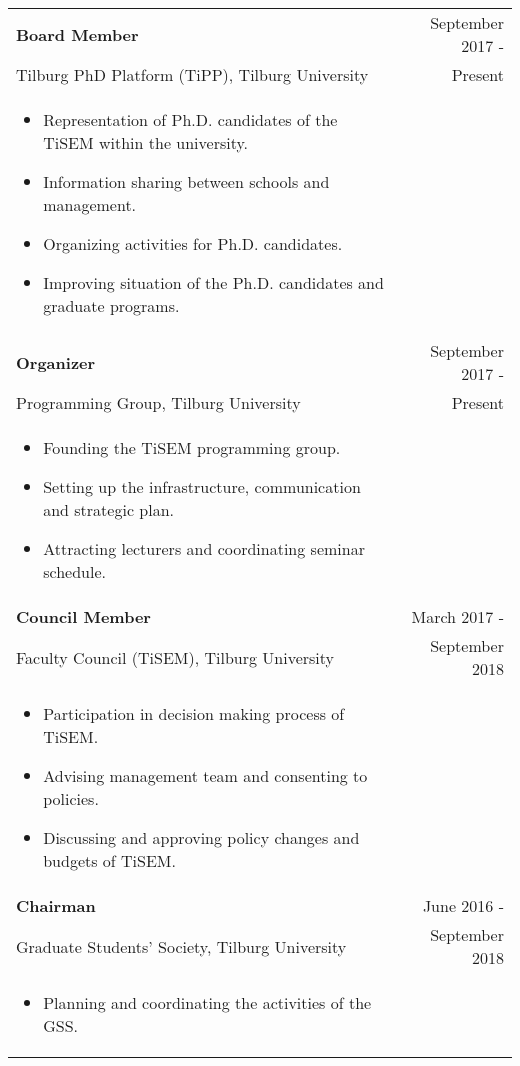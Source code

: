 \documentclass[a4paper,10pt]{article} %
\begin{document}
\begin{tabular}{p{12cm} r}
	\textbf{Board Member}  &September 2017 -\\
	Tilburg PhD Platform (TiPP), {Tilburg University} & Present\phantom{ -}\\
	\begin{itemize}[noitemsep]
		\item Representation of Ph.D. candidates of the TiSEM within the university.
		\item Information sharing between schools and management.
		\item Organizing activities for Ph.D. candidates.
		\item Improving situation of the Ph.D. candidates and graduate programs.
	\end{itemize}&\\
	\textbf{Organizer}  &September 2017 -\\
	Programming Group, {Tilburg University} & Present\phantom{ -}\\
	\begin{itemize}[noitemsep]
		\item Founding the TiSEM programming group.
		\item Setting up the infrastructure, communication and strategic plan.
		\item Attracting lecturers and coordinating seminar schedule.
	\end{itemize}&\\
	\textbf{Council Member}  &March 2017 -\\
	Faculty Council (TiSEM), {Tilburg University} & September 2018\phantom{ -}\\
	\begin{itemize}[noitemsep]
		\item Participation in decision making process of TiSEM.
		\item Advising management team and consenting to policies.
		\item Discussing and approving policy changes and budgets of TiSEM.
	\end{itemize}&\\
	\textbf{Chairman}  &June 2016 -\\
	Graduate Students' Society, {Tilburg University} & September 2018\phantom{ -}\\
	\begin{itemize}[noitemsep]
		\item Planning and coordinating the activities of the GSS.

\end{itemize}
\end{tabular}
\end{document}
